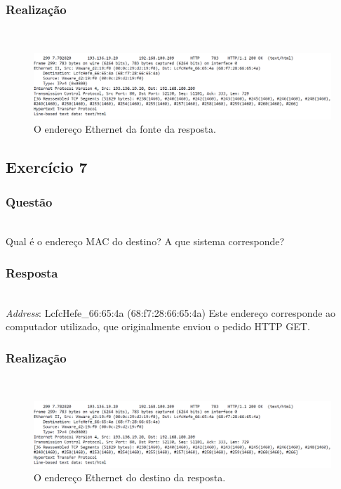 \documentclass{llncs}
\begin{document}
\subsubsection{Realização}\rule[-10pt]{0pt}{10pt}\\

\begin{figure}
  \begin{center}
  \includegraphics[scale=0.35]{imagens/HTTPresponse.png} 
  \end{center}
  \caption{O endereço Ethernet da fonte da resposta.}
  \label{fig:ethernet_response_source}
\end{figure}

\clearpage
\subsection{Exercício 7}
\subsubsection{Questão}\rule[-10pt]{0pt}{10pt}\\

Qual é o endereço MAC do destino? A que sistema corresponde?

\subsubsection{Resposta}\rule[-10pt]{0pt}{10pt}\\

\textit{Address}: LcfcHefe_66:65:4a (68:f7:28:66:65:4a)
Este endereço corresponde ao computador utilizado, que originalmente enviou o pedido HTTP GET.

\subsubsection{Realização}\rule[-10pt]{0pt}{10pt}\\

\begin{figure}
  \begin{center}
  \includegraphics[scale=0.35]{imagens/HTTPresponse.png} 
  \end{center}
  \caption{O endereço Ethernet do destino da resposta.}
  \label{fig:ethernet_response_dest}
\end{figure}
\end{document}
